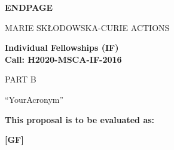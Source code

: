 \documentclass[a4paper,11pt]{article}
\newcommand{\acronym}{{\sc YourAcronym}\xspace}
\begin{document}
\vspace{15mm}
\begin{center}


        \Large{
      
     
        \textbf{ENDPAGE}
  
          \vspace{15mm}
          MARIE SK\L{}ODOWSKA-CURIE ACTIONS\\
          \vspace{1cm}
          
          \textbf{Individual Fellowships (IF)}\\
          \textbf{Call: H2020-MSCA-IF-2016}
          \vspace{2cm}                   

          PART B
          \vspace{2.5cm}

          ``\acronym''
          \vspace{2cm}

          \textbf{This proposal is to be evaluated as:}
          \vspace{.5cm}

          \textbf{[GF]}
        }

  \end{center}
\vspace{1cm}
\end{document}
